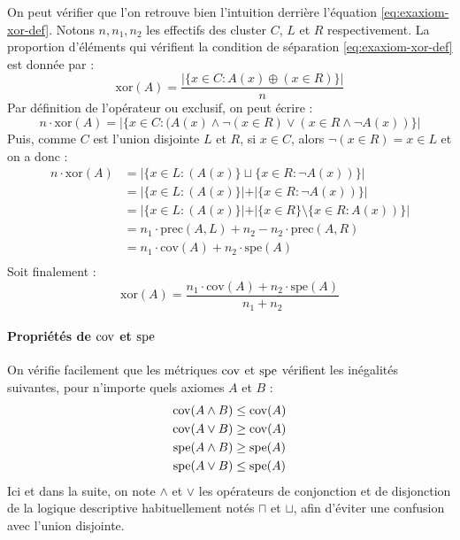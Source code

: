 On peut vérifier que l'on retrouve bien l'intuition derrière l'équation \ref{eq:exaxiom-xor-def}. Notons $n, n_1, n_2$ les effectifs des cluster $C$, $L$ et $R$ respectivement. La proportion d'éléments qui vérifient la condition de séparation \ref{eq:exaxiom-xor-def} est donnée par :
\begin{equation}
    \text{xor}(A) = \frac{| \{x \in C : A(x) \oplus (x \in R) \}|}{n}
\end{equation}
Par définition de l'opérateur ou exclusif, on peut écrire :
\begin{equation}
    n \cdot \text{xor}(A) = |\{x \in C: (A(x) \land \neg (x \in R) \lor (x \in R \land \neg A(x)) \}|
\end{equation}
Puis, comme $C$ est l'union disjointe $L$ et $R$, si $x \in C$, alors $\neg (x \in R) = x \in L$ et on a donc :
\begin{align*}
    n \cdot \text{xor}(A) &= |\{x \in L: (A(x)\} \sqcup \{x \in R : \neg A(x)) \}| \\
    &= |\{x \in L: (A(x)\} | + | \{x \in R : \neg A(x)) \}|  \\
    &= |\{x \in L: (A(x)\} | + | \{x \in R \} \setminus \{x \in R : A(x)) \}| \\
    &= n_1 \cdot \text{prec}(A, L) + n_2 - n_2 \cdot \text{prec}(A, R) \\
    &= n_1 \cdot \text{cov}(A) + n_2 \cdot \text{spe}(A) \\
\end{align*}
Soit finalement :
\begin{equation}
    \text{xor}(A) = \frac{n_1 \cdot \text{cov}(A) + n_2 \cdot \text{spe}(A)}{n_1 + n_2}
\end{equation}

\paragraph{Propriétés de $\operatorname{cov}$ et $\operatorname{spe}$}

On vérifie facilement que les métriques $\operatorname{cov}$ et $\operatorname{spe}$ vérifient les inégalités suivantes, pour n'importe quels axiomes $A$ et $B$ :
\begin{align}
    \operatorname{cov}(A \land B) & \leq \operatorname{cov}(A) \\
    \operatorname{cov}(A \lor B) & \geq \operatorname{cov}(A)  \label{eq:cov-disjunct} \\
    \operatorname{spe}(A \land B) & \geq \operatorname{spe}(A) \label{eq:cov-conjunct} \\
    \operatorname{spe}(A \lor B) & \leq \operatorname{spe}(A)
\end{align}
Ici et dans la suite, on note $\land$ et $\lor$ les opérateurs de conjonction et de disjonction de la logique descriptive habituellement notés $\sqcap$ et $\sqcup$, afin d'éviter une confusion avec l'union disjointe.


